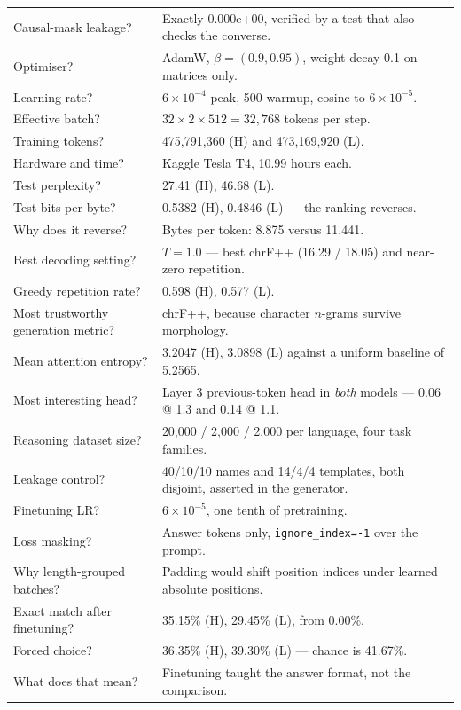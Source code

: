 \documentclass[11pt]{report}
\begin{document}
\begin{longtable}{@{}p{6.6cm}p{8.4cm}@{}}
Causal-mask leakage? & Exactly 0.000e+00, verified by a test that also checks the converse. \\
Optimiser? & AdamW, $\beta=(0.9,0.95)$, weight decay 0.1 on matrices only. \\
Learning rate? & $6\times10^{-4}$ peak, 500 warmup, cosine to $6\times10^{-5}$. \\
Effective batch? & $32 \times 2 \times 512 = 32{,}768$ tokens per step. \\
Training tokens? & 475,791,360 (H) and 473,169,920 (L). \\
Hardware and time? & Kaggle Tesla T4, 10.99 hours each. \\
Test perplexity? & 27.41 (H), 46.68 (L). \\
Test bits-per-byte? & 0.5382 (H), 0.4846 (L) --- the ranking reverses. \\
Why does it reverse? & Bytes per token: 8.875 versus 11.441. \\
Best decoding setting? & $T=1.0$ --- best chrF++ (16.29 / 18.05) and near-zero repetition. \\
Greedy repetition rate? & 0.598 (H), 0.577 (L). \\
Most trustworthy generation metric? & chrF++, because character $n$-grams survive morphology. \\
Mean attention entropy? & 3.2047 (H), 3.0898 (L) against a uniform baseline of 5.2565. \\
Most interesting head? & Layer 3 previous-token head in \emph{both} models --- 0.06 @ 1.3 and 0.14 @ 1.1. \\
Reasoning dataset size? & 20,000 / 2,000 / 2,000 per language, four task families. \\
Leakage control? & 40/10/10 names and 14/4/4 templates, both disjoint, asserted in the generator. \\
Finetuning LR? & $6\times10^{-5}$, one tenth of pretraining. \\
Loss masking? & Answer tokens only, \texttt{ignore\_index=-1} over the prompt. \\
Why length-grouped batches? & Padding would shift position indices under learned absolute positions. \\
Exact match after finetuning? & 35.15\% (H), 29.45\% (L), from 0.00\%. \\
Forced choice? & 36.35\% (H), 39.30\% (L) --- chance is 41.67\%. \\
What does that mean? & Finetuning taught the answer format, not the comparison. \\

\end{longtable}
\end{document}
